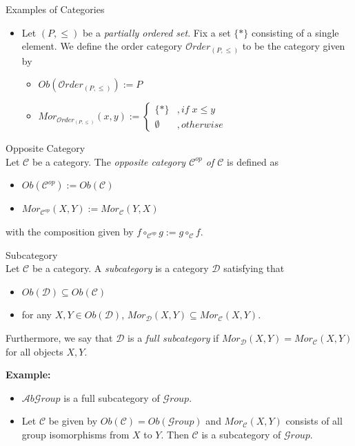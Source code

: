 \begin{definition}{Examples of Categories}
\begin{itemize}
    \item Let $(P,\leq)$ be a \textit{partially ordered set}. Fix a set $\{ *\}$ consisting of a single element. We define the order category $\mathcal{O}rder_{(P,\leq)}$ to be the category given by
    \begin{itemize}
        \item $Ob(\mathcal{O}rder_{(P,\leq)}) := P$
        \item $Mor_{\mathcal{O}rder_{(P,\leq)}} (x,y) := \begin{cases}
            \{*\} &,if\; x \leq y\\
            \emptyset &,otherwise
        \end{cases}$
    \end{itemize}
\end{itemize}
\end{definition}

\begin{definition}{Opposite Category}\\
Let $\mathcal{C}$ be a category. The \textit{opposite category $\mathcal{C}^{op}$ of $\mathcal{C}$} is defined as
\begin{itemize}
    \item $Ob(\mathcal{C}^{op}) := Ob(\mathcal{C})$
    \item $Mor_{\mathcal{C}^{op}}(X,Y) := Mor_{\mathcal{C}}(Y,X)$
\end{itemize}
with the composition given by $f \circ _{\mathcal{C}^{op}} g := g \circ _\mathcal{C} f$.
\end{definition}

\begin{definition}{Subcategory}\\
Let $\mathcal{C}$ be a category. A \textit{subcategory} is a category $\mathcal{D}$ satisfying that
\begin{itemize}
    \item $Ob(\mathcal{D}) \subseteq Ob(\mathcal{C})$
    \item for any $X,Y \in Ob(\mathcal{D})$, $Mor_{\mathcal{D}}(X,Y) \subseteq Mor_{\mathcal{C}}(X,Y)$.
\end{itemize}
Furthermore, we say that $\mathcal{D}$ is a \textit{full subcategory} if $Mor_{\mathcal{D}}(X,Y) = Mor_{\mathcal{C}}(X,Y)$ for all objects $X,Y$.
\end{definition}

\noindent\textbf{Example:}
\begin{itemize}
    \item $\mathcal{A}b\mathcal{G}roup$ is a full subcategory of $\mathcal{G}roup$.
    \item Let $\mathcal{C}$ be given by $Ob(\mathcal{C}) = Ob(\mathcal{G}roup)$ and $Mor_{\mathcal{C}} (X,Y)$ consists of all group isomorphisms from $X$ to $Y$. Then $\mathcal{C}$ is a subcategory of $\mathcal{G}roup$.
\end{itemize}

